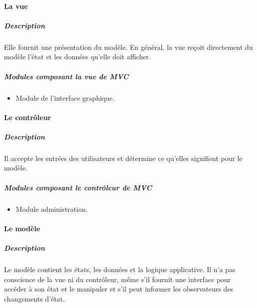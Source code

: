 \documentclass[10pt,a4paper]{report}
\begin{document}
		\paragraph{La vue}
			\subparagraph{Description}
			\begin{flushleft}
				Elle fournit une présentation du modèle. En général, la vue reçoit directement du modèle l’état et les données qu’elle doit afficher.
			\end{flushleft}
			
			\subparagraph{Modules composant la vue de MVC}
			\begin{flushleft}
				\begin{itemize}
				 	\item Module de l'interface graphique.
				\end{itemize}
			\end{flushleft}
			
		\paragraph{Le contrôleur}
			\subparagraph{Description}
			\begin{flushleft}
				Il accepte les entrées des utilisateurs et détermine ce qu’elles
signifient pour le modèle.
			\end{flushleft}
			
			\subparagraph{Modules composant le contrôleur de MVC}
			\begin{flushleft}
				\begin{itemize}
					\item Module administration.
				\end{itemize}
			\end{flushleft}
			
		\paragraph{Le modèle}
			\subparagraph{Description}
			\begin{flushleft}
				Le modèle contient les états, les données et la logique applicative. Il n’a pas conscience de la vue ni du contrôleur, même s’il fournit une interface pour accéder à son état et le manipuler et s’il peut informer les observateurs des changements d’état.
			\end{flushleft}
			
\end{document}
